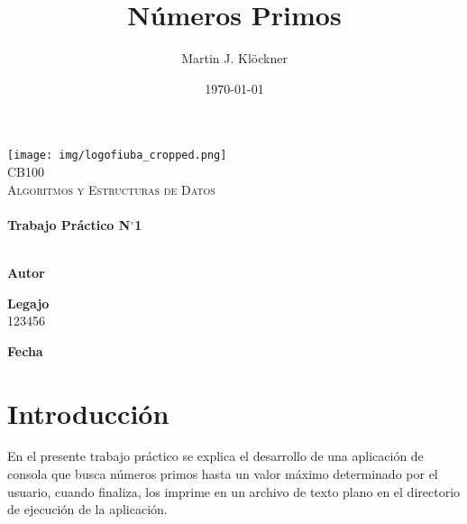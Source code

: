 \documentclass[12pt]{article}
\title{Números Primos}          %
\author{Martin J. Klöckner}     %
\date{\today}                   %
\makeatletter
\newcommand{\padron}{123456}    %
\newcommand{\tpnumber}{1}       %
\let\thetitle\@title
\let\theauthor\@author
\let\thedate\@date
\makeatother
\begin{document}
\begin{titlepage}
    \vspace*{-2.25cm}
    \texttt{[image: img/logofiuba\_cropped.png]}\\[2.25 cm]
    \centering
    \textsc{\Large CB100}\\[0.2 cm]
    \textsc{\large Algoritmos y Estructuras de Datos}\\[4 cm]
    \textcolor{cyan}{{\fontsize{40}{60}\selectfont \bfseries \thetitle}}\\[0.5cm]
    {\Large \bfseries Trabajo Práctico N$^\circ$\tpnumber}\\[5cm]


    \vfill
    \noindent\makebox[\linewidth]{\rule{\textwidth}{0.4pt}}\\[0.5cm]
    \begin{minipage}{.46\textwidth}
    \textbf{Autor}\\
    \theauthor
    \end{minipage}%
    \begin{minipage}{.34\textwidth}
    \textbf{Legajo}\\
    \padron
    \end{minipage}%
    \begin{minipage}{.2\textwidth}
     \begin{flushright}
        \textbf{Fecha}\\
        \thedate
    \end{flushright}
    \end{minipage}
\end{titlepage}


{
    \hypersetup{linkcolor=black} %
    \tableofcontents
    \thispagestyle{empty}
    \pagebreak
    \setcounter{page}{1}
}


\section{Introducción}

En el presente trabajo práctico se explica el desarrollo de una aplicación de
consola que busca números primos hasta un valor máximo determinado por el
usuario, cuando finaliza, los imprime en un archivo de texto plano en el
directorio de ejecución de la aplicación.
\end{document}
